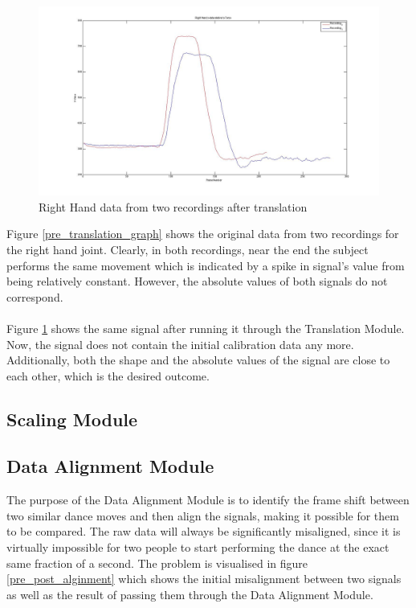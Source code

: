 \documentclass[a4paper]{article}
\begin{document}
\begin{figure}[h]
\centering
\includegraphics[scale=0.3]{R_H_Data_Relative_Torso.jpg}
\caption{Right Hand data from two recordings after translation}
\label{post_translation_graph}
\end{figure}

\noindent
Figure \ref{pre_translation_graph} shows the original data from two recordings for the right hand joint. Clearly, in both recordings, near the end the subject performs the same movement which is indicated by a spike in signal's value from being relatively constant. However, the absolute values of both signals do not correspond.
\\\\
\noindent
Figure \ref{post_translation_graph} shows the same signal after running it through the Translation Module. Now, the signal does not contain the initial calibration data any more. Additionally, both the shape and the absolute values of the signal are close to each other, which is the desired outcome.

\clearpage
\subsection{Scaling Module}
\subsection{Data Alignment Module}
\noindent
The purpose of the Data Alignment Module is to identify the frame shift between two similar dance moves and then align the signals, making it possible for them to be compared. The raw data will always be significantly misaligned, since it is virtually impossible for two people to start performing the dance at the exact same fraction of a second. The problem is visualised in figure \ref{pre_post_alginment} which shows the initial misalignment between two signals as well as the result of passing them through the Data Alignment Module.
\end{document}
